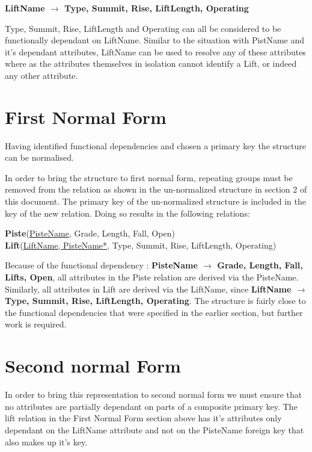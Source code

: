 \documentclass[titlepage ,12pt]{article}
\begin{document}
\textbf{LiftName \begin{math}\rightarrow\end{math} Type, Summit, Rise, LiftLength, Operating}
 
Type, Summit, Rise, LiftLength and Operating can all be considered to be functionally dependant on LiftName. Similar to the situation with PistName and it's dependant attributes, LiftName can be used to resolve any of these attributes where as the attributes themselves in isolation cannot identify a Lift, or indeed any other attribute. 


\section{First Normal Form}
Having identified functional dependencies and chosen a primary key the structure can be normalised.

In order to bring the structure to first normal form, repeating groups must be removed from the relation as shown in the un-normalized structure in section 2 of this document. The primary key of the un-normalized structure is included in the key of the new relation. Doing so results in the following relations:

\textbf{Piste}(\underline{PisteName}, Grade, Length, Fall, Open) \\
\textbf{Lift}(\underline{LiftName, PisteName*}, Type, Summit, Rise, LiftLength, Operating)

Because of the functional dependency : \textbf{PisteName \begin{math}\rightarrow\end{math} Grade, Length, Fall, Lifts, Open}, all attributes in the Piste relation are derived via the PisteName.
Similarly, all attributes in Lift are derived via the LiftName, since \textbf{LiftName \begin{math}\rightarrow\end{math} Type, Summit, Rise, LiftLength, Operating}.
The structure is fairly close to the functional dependencies that were specified in the earlier section, but further work is required.

 


\section{Second normal Form}
In order to bring this representation to second normal form we must ensure that no attributes are partially dependant on parts of a composite primary key. The lift relation in the First Normal Form section above has it's attributes only dependant on the LiftName attribute and not on the PisteName foreign key that also makes up it's key. 
\end{document}

